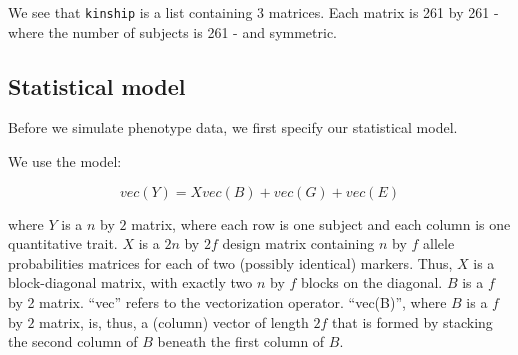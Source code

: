 \documentclass[oneside]{book}\usepackage[]{graphicx}\usepackage[]{color}
\newenvironment{Shaded}{\begin{snugshade}}{\end{snugshade}}
\newcommand{\CommentTok}[1]{\textcolor[rgb]{0.56,0.35,0.01}{\textit{#1}}}
\newcommand{\KeywordTok}[1]{\textcolor[rgb]{0.13,0.29,0.53}{\textbf{#1}}}
\newcommand{\NormalTok}[1]{#1}
\begin{document}
\begin{Shaded}
\end{Shaded}

We see that \texttt{kinship} is a list containing 3 matrices. Each
matrix is 261 by 261 - where the number of subjects is 261 - and
symmetric.

\hypertarget{statistical-model}{%
\subsection{Statistical model}\label{statistical-model}}

Before we simulate phenotype data, we first specify our statistical
model.

We use the model:

\[vec(Y) = X vec(B) + vec(G) + vec(E)\]

where \(Y\) is a \(n\) by \(2\) matrix, where each row is one subject
and each column is one quantitative trait. \(X\) is a \(2n\) by \(2f\)
design matrix containing \(n\) by \(f\) allele probabilities matrices
for each of two (possibly identical) markers. Thus, \(X\) is a
block-diagonal matrix, with exactly two \(n\) by \(f\) blocks on the
diagonal. \(B\) is a \(f\) by 2 matrix. ``vec'' refers to the
vectorization operator. ``vec(B)'', where \(B\) is a \(f\) by \(2\)
matrix, is, thus, a (column) vector of length \(2f\) that is formed by
stacking the second column of \(B\) beneath the first column of \(B\).
\end{document}
